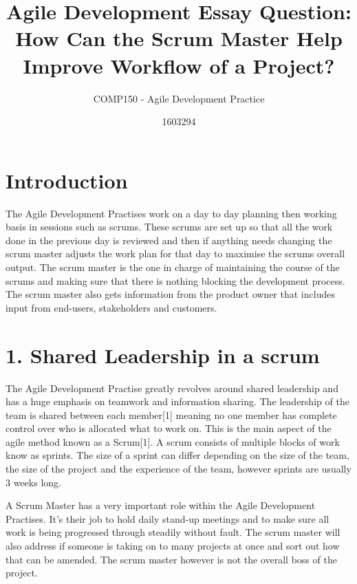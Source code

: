\documentclass{scrartcl}
\title{Agile Development Essay Question: How Can the Scrum Master Help Improve Workflow of a Project?}
\subtitle{COMP150 - Agile Development Practice}
\author{1603294}
\begin{document}
\maketitle


\section{Introduction}

The Agile Development Practises work on a day to day planning then working basis in sessions such as scrums. These scrums are set up so that all the work done in the previous day is reviewed and then if anything needs changing the scrum master adjusts the work plan for that day to maximise the scrums overall output. The scrum master is the one in charge of maintaining the course of the scrums and making sure that there is nothing blocking the development process. The scrum master also gets information from the product owner that includes input from end-users, stakeholders and customers.

\section{1. Shared Leadership in a scrum}

The Agile Development Practise greatly revolves around shared leadership and has a huge emphasis on teamwork and information sharing. The leadership of the team is shared between each member[1] meaning no one member has complete control over who is allocated what to work on. This is the main aspect of the agile method known as a Scrum[1]. A scrum consists of multiple blocks of work know as sprints. The size of a sprint can differ depending on the size of the team, the size of the project and the experience of the team, however sprints are usually 3 weeks long.

A Scrum Master has a very important role within the Agile Development Practises. It's their job to hold daily stand-up meetings and to make sure all work is being progressed through steadily without fault. The scrum master will also address if someone is taking on to many projects at once and sort out how that can be amended. The scrum master however is not the overall boss of the project.
\end{document}
